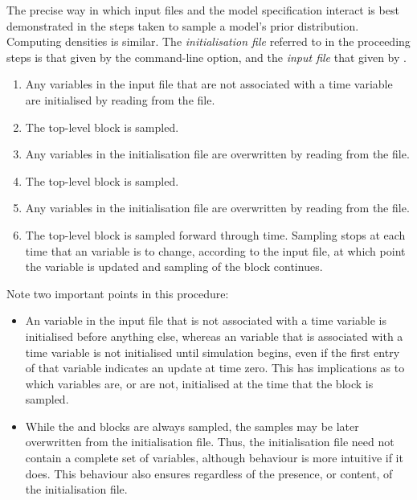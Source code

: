 The precise way in which input files and the model specification interact is
best demonstrated in the steps taken to sample a model's prior
distribution. Computing densities is similar. The \emph{initialisation file}
referred to in the proceeding steps is that given by the 
command-line option, and the \emph{input file} that given by
.
\begin{enumerate}
\item Any  variables in the input file that are not associated with
  a time variable are initialised by reading from the file.
\item The  top-level block is sampled.
\item Any  variables in the initialisation file are overwritten
  by reading from the file.
\item The  top-level block is sampled.
\item Any  variables in the initialisation file are overwritten
  by reading from the file.
\item The  top-level block is sampled forward through
  time. Sampling stops at each time that an  variable is to
  change, according to the input file, at which point the 
  variable is updated and sampling of the  block
  continues.
\end{enumerate}

Note two important points in this procedure:
\begin{itemize}
\item An  variable in the input file that is not associated with a
  time variable is initialised before anything else, whereas an 
  variable that is associated with a time variable is not initialised until
  simulation begins, even if the first entry of that variable indicates an
  update at time zero. This has implications as to which 
  variables are, or are not, initialised at the time that the
   block is sampled.
\item While the  and  blocks are always
  sampled, the samples may be later overwritten from the initialisation
  file. Thus, the initialisation file need not contain a complete set of
  variables, although behaviour is more intuitive if it does. This behaviour
  also ensures  regardless of the presence, or content, of the
  initialisation file.
\end{itemize}

